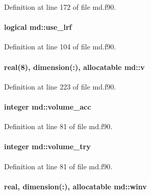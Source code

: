 Definition at line 172 of file md.\-f90.

\hypertarget{classmd_a746711fa2c6f67487c451b41385fb71a}{
\paragraph[{use\-\_\-lrf}]{\setlength{\rightskip}{0pt plus 5cm}logical md\-::use\-\_\-lrf}}\label{classmd_a746711fa2c6f67487c451b41385fb71a}


Definition at line 104 of file md.\-f90.

\hypertarget{classmd_a0eb489f64d496d6a73efa40b03d7a7ac}{
\paragraph[{v}]{\setlength{\rightskip}{0pt plus 5cm}real(8), dimension(\-:), allocatable md\-::v}}\label{classmd_a0eb489f64d496d6a73efa40b03d7a7ac}


Definition at line 223 of file md.\-f90.

\hypertarget{classmd_aadcb8922310a49876dd1f9fe68f5f827}{
\paragraph[{volume\-\_\-acc}]{\setlength{\rightskip}{0pt plus 5cm}integer md\-::volume\-\_\-acc}}\label{classmd_aadcb8922310a49876dd1f9fe68f5f827}


Definition at line 81 of file md.\-f90.

\hypertarget{classmd_a7246eabdc87cc706c07e7c80bf0b8a30}{
\paragraph[{volume\-\_\-try}]{\setlength{\rightskip}{0pt plus 5cm}integer md\-::volume\-\_\-try}}\label{classmd_a7246eabdc87cc706c07e7c80bf0b8a30}


Definition at line 81 of file md.\-f90.

\hypertarget{classmd_aa6a352396cbf609b8cbeed1a5bb5aed4}{
\paragraph[{winv}]{\setlength{\rightskip}{0pt plus 5cm}real, dimension(\-:), allocatable md\-::winv}}\label{classmd_aa6a352396cbf609b8cbeed1a5bb5aed4}


